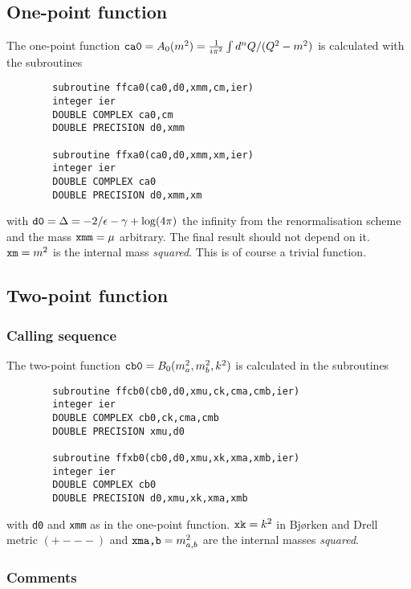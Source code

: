 
\subsection{One-point function}

The one-point function $\mbox{\tt ca0} = A_0(m^2) = \frac{1}{i\pi^2}\int d^n 
Q/(Q^2-m^2)$ is calculated with the subroutines
\begin{verbatim}
        subroutine ffca0(ca0,d0,xmm,cm,ier)
        integer ier
        DOUBLE COMPLEX ca0,cm
        DOUBLE PRECISION d0,xmm

        subroutine ffxa0(ca0,d0,xmm,xm,ier)
        integer ier
        DOUBLE COMPLEX ca0
        DOUBLE PRECISION d0,xmm,xm
\end{verbatim}
with $\mbox{\tt d0} = \Delta = -2/\epsilon - \gamma + \log(4\pi) $ the 
infinity from the renormalisation scheme and the mass $\mbox{\tt xmm} = \mu$ 
arbitrary.  The final result should not depend on it.  $\mbox{\tt xm} = m^2$ 
is the internal mass {\em squared}.  This is of course a trivial function.

\subsection{Two-point function}

\subsubsection{Calling sequence}

The two-point function $\mbox{\tt cb0} = B_0(m_a^2,m_b^2,k^2)$ is calculated 
in the subroutines
\begin{verbatim}
        subroutine ffcb0(cb0,d0,xmu,ck,cma,cmb,ier)
        integer ier
        DOUBLE COMPLEX cb0,ck,cma,cmb
        DOUBLE PRECISION xmu,d0

        subroutine ffxb0(cb0,d0,xmu,xk,xma,xmb,ier)
        integer ier
        DOUBLE COMPLEX cb0
        DOUBLE PRECISION d0,xmu,xk,xma,xmb
\end{verbatim}
with {\tt d0} and {\tt xmm} as in the one-point function. $\mbox{\tt xk} = 
k^2$ in Bj{\o}rken and Drell metric {\small $(+---)$} and $\mbox{\tt xma,b} = 
m_{a,b}^2$ are the internal masses {\em squared}.  

\subsubsection{Comments}

